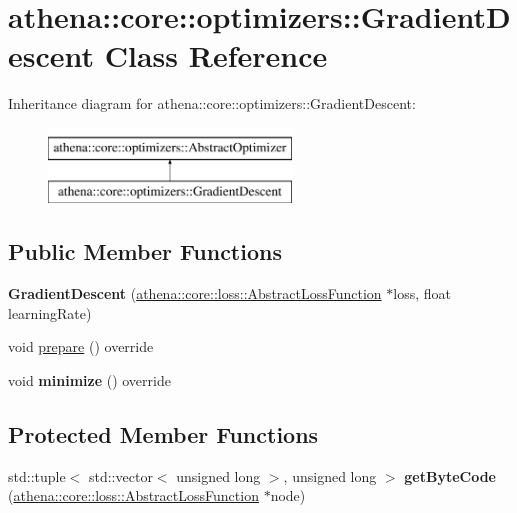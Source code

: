 \hypertarget{classathena_1_1core_1_1optimizers_1_1_gradient_descent}{}\section{athena\+:\+:core\+:\+:optimizers\+:\+:Gradient\+Descent Class Reference}
\label{classathena_1_1core_1_1optimizers_1_1_gradient_descent}
Inheritance diagram for athena\+:\+:core\+:\+:optimizers\+:\+:Gradient\+Descent\+:\begin{figure}[H]
\begin{center}
\leavevmode
\includegraphics[height=2.000000cm]{dd/d53/classathena_1_1core_1_1optimizers_1_1_gradient_descent}
\end{center}
\end{figure}
\subsection*{Public Member Functions}
\begin{DoxyCompactItemize}
\item 
\mbox{\label{classathena_1_1core_1_1optimizers_1_1_gradient_descent_a1f81ba3b4a6291f37a33f7eb903ecdfe}} 
{\bfseries Gradient\+Descent} (\mbox{\hyperlink{classathena_1_1core_1_1loss_1_1_abstract_loss_function}{athena\+::core\+::loss\+::\+Abstract\+Loss\+Function}} $\ast$loss, float learning\+Rate)
\item 
void \mbox{\hyperlink{classathena_1_1core_1_1optimizers_1_1_gradient_descent_ab9ecd3b02a82c86bfaaa3d93789d2d5a}{prepare}} () override
\item 
\mbox{\label{classathena_1_1core_1_1optimizers_1_1_gradient_descent_a1403aaa8543b4f50e783ae19b26e2ea4}} 
void {\bfseries minimize} () override
\end{DoxyCompactItemize}
\subsection*{Protected Member Functions}
\begin{DoxyCompactItemize}
\item 
\mbox{\label{classathena_1_1core_1_1optimizers_1_1_gradient_descent_afadd2e418a6ed2a2b025b5cffdfa7d4c}} 
std\+::tuple$<$ std\+::vector$<$ unsigned long $>$, unsigned long $>$ {\bfseries get\+Byte\+Code} (\mbox{\hyperlink{classathena_1_1core_1_1loss_1_1_abstract_loss_function}{athena\+::core\+::loss\+::\+Abstract\+Loss\+Function}} $\ast$node)
\end{DoxyCompactItemize}
